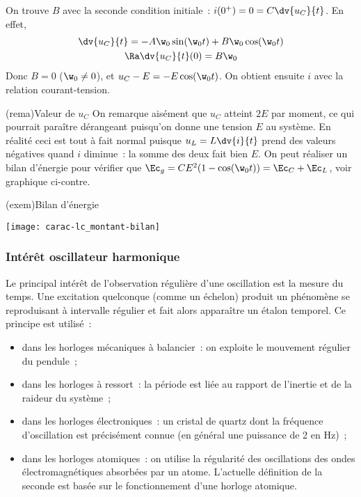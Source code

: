 \documentclass[../../main/main.tex]{subfiles}
\begin{document}
\begin{tcbraster}[raster columns=2, raster equal height=rows]
\begin{tcb}[label=demo:rcsolu]
		On trouve $B$ avec la seconde condition initiale~: $i(0^+) = 0 = C
			\dv{u_C}{t}$. En effet,
		\begin{gather*}
			\dv{u_C}{t} = -A\w_0\sin(\w_0t) + B\w_0\cos(\w_0t)\\
			\Ra \dv{u_C}{t} (0) = B\w_0
		\end{gather*}
		Donc $B = 0$ ($\w_0 \neq 0$), et $u_C - E = -E\cos(\w_0t)$. On obtient
		ensuite $i$ avec la relation courant-tension.
	\end{tcb}
	\begin{tcb}[label=rema:lccharge](rema){Valeur de $u_C$}
		On remarque aisément que $u_C$ atteint $2E$ par moment, ce qui pourrait
		paraître dérangeant puisqu'on donne une tension $E$ au système. En
		réalité ceci est tout à fait normal puisque $u_L = L\dv{i}{t}$ prend des
		valeurs négatives quand $i$ diminue~: la somme des deux fait bien $E$.
		On peut réaliser un bilan d'énergie pour vérifier que $\Ec_g =
			CE^2(1-\cos(\w_0t)) = \Ec_C + \Ec_L$, voir graphique ci-contre.
	\end{tcb}
	\begin{tcb}[width=\linewidth](exem){Bilan d'énergie}
		\begin{center}
			\texttt{[image: carac-lc\_montant-bilan]}
		\end{center}
	\end{tcb}
\end{tcbraster}

\subsubsection{Intérêt oscillateur harmonique}

Le principal intérêt de l'observation régulière d'une oscillation est la mesure
du temps. Une excitation quelconque (comme un échelon) produit un phénomène se
reproduisant à intervalle régulier et fait alors apparaître un étalon
temporel. Ce principe est utilisé~:
\begin{itemize}
	\item dans les horloges mécaniques à balancier~: on exploite le mouvement
	      régulier du pendule~;
	\item dans les horloges à ressort~: la période est liée au rapport de
	      l'inertie et de la raideur du système~;
	\item dans les horloges électroniques~: un cristal de quartz dont la
	      fréquence d'oscillation est précisément connue (en général une puissance
	      de 2 en Hz)~;
	\item dans les horloges atomiques~: on utilise la régularité des
	      oscillations des ondes électromagnétiques absorbées par un atome.
	      L'actuelle définition de la seconde est basée sur le fonctionnement
	      d'une horloge atomique.
\end{itemize}
\end{document}
